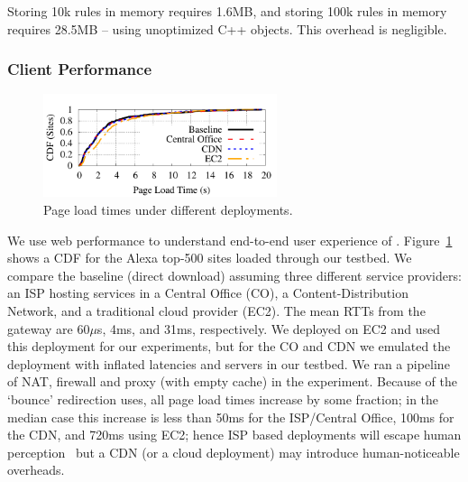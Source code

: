 Storing 10k rules in memory requires 1.6MB, and storing 100k rules in memory requires 28.5MB -- using unoptimized C++ objects.
This overhead is negligible.%

\subsubsection{Client Performance}

\begin{figure}
  \vspace{-10pt}
  \hspace{-15pt}
  \centering
  \includegraphics[width=2.7in]{fig/e2e_compare}
  \caption[]{\label{fig:e2eloads} Page load times under different deployments.}
\end{figure}

We use web performance to understand end-to-end user experience of \sys.
Figure~\ref{fig:e2eloads} shows a CDF for the Alexa top-500 sites loaded through our testbed. We compare the baseline (direct download) assuming three different service providers: an ISP hosting services in a Central Office (CO), a Content-Distribution Network, and a traditional cloud provider (EC2). The mean RTTs from the gateway are 60$\mu$s, 4ms, and 31ms, respectively. We deployed \sys on EC2 and used this deployment for our experiments, but for the CO and CDN we emulated the deployment with inflated latencies and servers in our testbed. We ran a pipeline of NAT, firewall and proxy (with empty cache) in the experiment.
Because of the `bounce' redirection \sys uses, all page load times increase by some fraction; in the median case this increase is less than 50ms for the ISP/Central Office, 100ms for the CDN, and 720ms using EC2; hence ISP based deployments will escape human perception~\cite{millishumans} but a CDN (or a cloud deployment) may introduce human-noticeable overheads.

